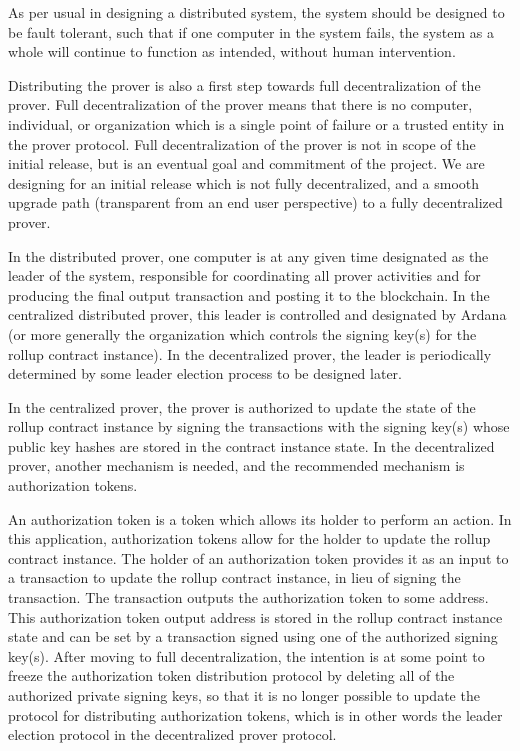 \documentclass[12pt]{article}
\begin{document}
As per usual in designing a distributed system, the system should be designed to be fault tolerant, such that if one computer in the system fails, the system as a whole will continue to function as intended, without human intervention.

Distributing the prover is also a first step towards full decentralization of the prover. Full decentralization of the prover means that there is no computer, individual, or organization which is a single point of failure or a trusted entity in the prover protocol. Full decentralization of the prover is not in scope of the initial release, but is an eventual goal and commitment of the project. We are designing for an initial release which is not fully decentralized, and a smooth upgrade path (transparent from an end user perspective) to a fully decentralized prover.

In the distributed prover, one computer is at any given time designated as the leader of the system, responsible for coordinating all prover activities and for producing the final output transaction and posting it to the blockchain. In the centralized distributed prover, this leader is controlled and designated by Ardana (or more generally the organization which controls the signing key(s) for the rollup contract instance). In the decentralized prover, the leader is periodically determined by some leader election process to be designed later.

In the centralized prover, the prover is authorized to update the state of the rollup contract instance by signing the transactions with the signing key(s) whose public key hashes are stored in the contract instance state. In the decentralized prover, another mechanism is needed, and the recommended mechanism is authorization tokens.

An authorization token is a token which allows its holder to perform an action. In this application, authorization tokens allow for the holder to update the rollup contract instance. The holder of an authorization token provides it as an input to a transaction to update the rollup contract instance, in lieu of signing the transaction. The transaction outputs the authorization token to some address. This authorization token output address is stored in the rollup contract instance state and can be set by a transaction signed using one of the authorized signing key(s). After moving to full decentralization, the intention is at some point to freeze the authorization token distribution protocol by deleting all of the authorized private signing keys, so that it is no longer possible to update the protocol for distributing authorization tokens, which is in other words the leader election protocol in the decentralized prover protocol.
\end{document}
